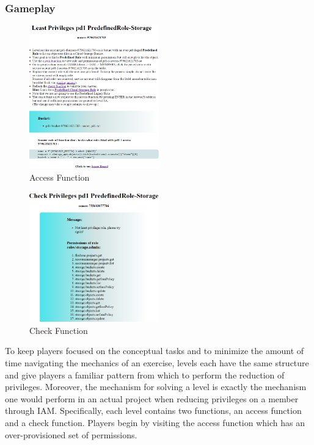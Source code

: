 \subsubsection{Gameplay}
\begin{figure}[!h]
  \centering
  \includegraphics[width=0.5\textwidth]{pic/access}
  \caption {Access Function}
  \label{fig:access}
\end{figure}
\begin{figure}[!h]
  \centering
  \includegraphics[width=0.5\textwidth]{pic/check}
  \caption {Check Function}
  \label{fig:check}
\end{figure}
To keep players focused on the conceptual tasks and to minimize the amount of time navigating the mechanics of
an exercise, levels each have the same structure and give players a familiar pattern from which to perform the reduction of privileges.
Moreover, the mechanism for solving a level is exactly the mechanism one would perform in an actual project when reducing privileges
on a member through IAM.  Specifically, each level contains two functions, an access function and a check function.
Players begin by visiting the access function which has an over-provisioned set of permissions.

